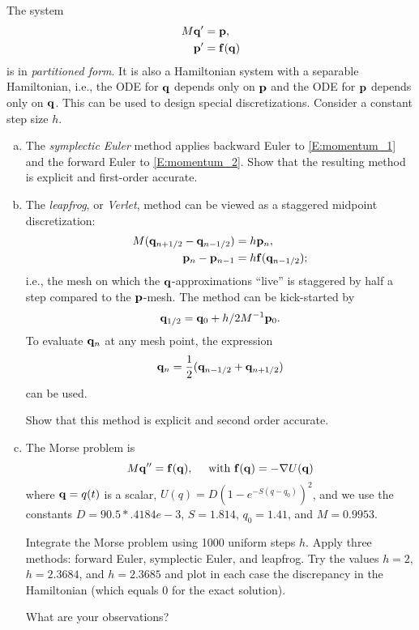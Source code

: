 \begin{problem}[A\&P 4.11]
  The system
  \begin{subequations}
    \begin{align}
      \label{E:momentum_1}
      M \mathbf{q}' &= \mathbf{p}, \\
      \label{E:momentum_2}
      \mathbf{p}' &= \mathbf{f}(\mathbf{q})
    \end{align}
  \end{subequations}
  is in \emph{partitioned form}. It is also a Hamiltonian system with a separable Hamiltonian, i.e., the ODE for $\mathbf{q}$ depends only on $\mathbf{p}$ and the ODE for $\mathbf{p}$ depends only on $\mathbf{q}$. This can be used to design special discretizations. Consider a constant step size $h$.
  \begin{enumerate}[(a)]
    \item The \emph{symplectic Euler} method applies backward Euler to \eqref{E:momentum_1} and the forward Euler to \eqref{E:momentum_2}. Show that the resulting method is explicit and first-order accurate.
    \item The \emph{leapfrog}, or \emph{Verlet}, method can be viewed as a staggered midpoint discretization:
    \begin{align*}
      M(\mathbf{q}_{n+1/2} - \mathbf{q}_{n-1/2}) &= h \mathbf{p}_n, \\
      \mathbf{p}_n - \mathbf{p}_{n-1} &= h \mathbf{f}(\mathbf{q}_{n-1/2});
    \end{align*}
    i.e., the mesh on which the $\mathbf{q}$-approximations ``live'' is staggered by half a step compared to the $\mathbf{p}$-mesh. The method can be kick-started by
    \[
      \mathbf{q}_{1/2} = \mathbf{q}_0 + h/2 M^{-1}\mathbf{p}_0.
    \]
    To evaluate $\mathbf{q}_n$ at any mesh point, the expression
    \[
      \mathbf{q}_n = \frac12 (\mathbf{q}_{n-1/2} + \mathbf{q}_{n+1/2})
    \]
    can be used.
    
    Show that this method is explicit and second order accurate.
    \item The Morse problem is 
    \[
      M \mathbf{q}'' = \mathbf{f}(\mathbf{q}), \quad \text{ with } \mathbf{f}(\mathbf{q}) = -\mathbf{\nabla} U(\mathbf{q})
    \]
    where $\mathbf{q} = q(t)$ is a scalar, $U(q) = D(1 - e^{-S(q-q_0)})^2$, and we use the constants $D = 90.5*.4184e-3$, $S = 1.814$, $q_0 = 1.41$, and $M = 0.9953$.
    
    Integrate the Morse problem using 1000 uniform steps $h$. Apply three methods: forward Euler, symplectic Euler, and leapfrog. Try the values $h = 2$, $h = 2.3684$, and $h = 2.3685$ and plot in each case the discrepancy in the Hamiltonian (which equals 0 for the exact solution).
    
    What are your observations?
  \end{enumerate}
\end{problem}

